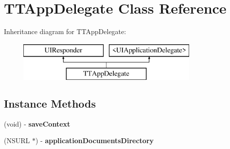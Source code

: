 \hypertarget{interface_t_t_app_delegate}{\section{T\-T\-App\-Delegate Class Reference}
\label{interface_t_t_app_delegate}
}
Inheritance diagram for T\-T\-App\-Delegate\-:\begin{figure}[H]
\begin{center}
\leavevmode
\includegraphics[height=2.000000cm]{interface_t_t_app_delegate}
\end{center}
\end{figure}
\subsection*{Instance Methods}
\begin{DoxyCompactItemize}
\item 
\hypertarget{interface_t_t_app_delegate_acd3e7e2a5588d84b24be735c42fa422f}{(void) -\/ {\bfseries save\-Context}}\label{interface_t_t_app_delegate_acd3e7e2a5588d84b24be735c42fa422f}

\item 
\hypertarget{interface_t_t_app_delegate_a5f401a1ef2586adec3a47f8e45dbf2c0}{(N\-S\-U\-R\-L $\ast$) -\/ {\bfseries application\-Documents\-Directory}}\label{interface_t_t_app_delegate_a5f401a1ef2586adec3a47f8e45dbf2c0}

\end{DoxyCompactItemize}
